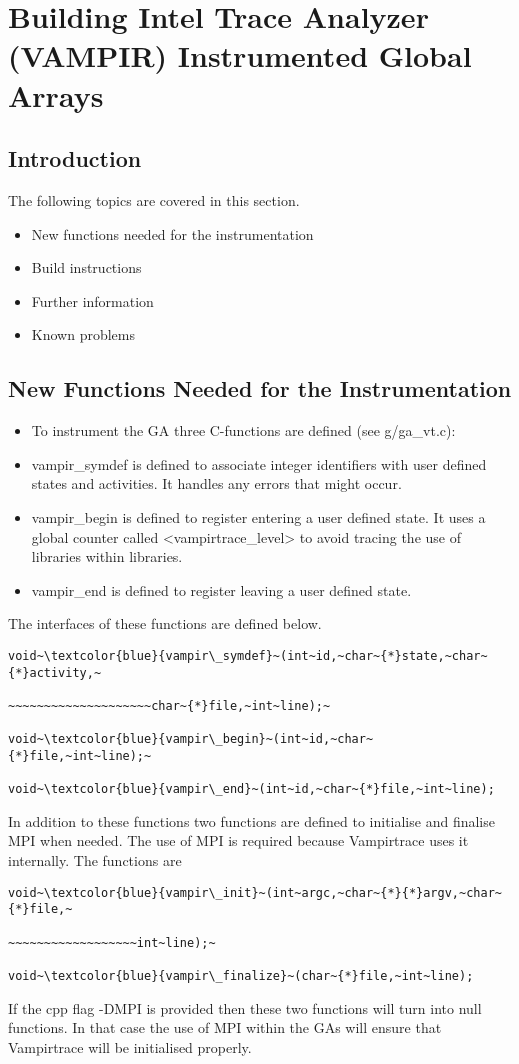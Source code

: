 \section{Building Intel Trace Analyzer (VAMPIR) Instrumented Global Arrays}


\subsection{Introduction}

The following topics are covered in this section.
\begin{itemize}
\item New functions needed for the instrumentation 
\item Build instructions 
\item Further information 
\item Known problems
\end{itemize}

\subsection{New Functions Needed for the Instrumentation}
\begin{itemize}
\item To instrument the GA three C-functions are defined (see g/ga\_vt.c): 
\item vampir\_symdef is defined to associate integer identifiers with user
defined states and activities. It handles any errors that might occur. 
\item vampir\_begin is defined to register entering a user defined state.
It uses a global counter called <vampirtrace\_level> to avoid tracing
the use of libraries within libraries. 
\item vampir\_end is defined to register leaving a user defined state.
\end{itemize}
The interfaces of these functions are defined below.
\begin{verbatim}
void~\textcolor{blue}{vampir\_symdef}~(int~id,~char~{*}state,~char~{*}activity,~

~~~~~~~~~~~~~~~~~~~~char~{*}file,~int~line);~

void~\textcolor{blue}{vampir\_begin}~(int~id,~char~{*}file,~int~line);~

void~\textcolor{blue}{vampir\_end}~(int~id,~char~{*}file,~int~line);
\end{verbatim}
In addition to these functions two functions are defined to initialise
and finalise MPI when needed. The use of MPI is required because Vampirtrace
uses it internally. The functions are
\begin{verbatim}
void~\textcolor{blue}{vampir\_init}~(int~argc,~char~{*}{*}argv,~char~{*}file,~

~~~~~~~~~~~~~~~~~~int~line);~

void~\textcolor{blue}{vampir\_finalize}~(char~{*}file,~int~line);
\end{verbatim}
If the cpp flag -DMPI is provided then these two functions will turn
into null functions. In that case the use of MPI within the GAs will
ensure that Vampirtrace will be initialised properly.

